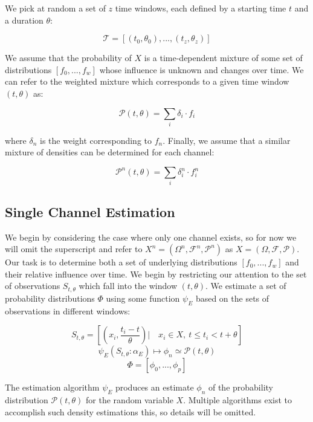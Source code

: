 \documentclass[10pt]{article}
\begin{document}
We pick at random a set of \( z \) time windows, each defined by a starting time \( t \) and a duration \( \theta \):

\[  \mathcal{T} = [(t_0,\theta_0),...,(t_z,\theta_z) ] \]

We assume that the probability of \(X \) is a time-dependent mixture of some set of distributions \( [f_0,...,f_w] \) whose influence is unknown and changes over time.  We can refer to the weighted mixture which corresponds to a given time window \( (t,\theta) \) as:

\begin{equation} \mathcal{P}(t,\theta) = \sum_i \delta_i \cdot f_i \end{equation}

where \( \delta_n \) is the weight corresponding to \( f_n \).  Finally, we assume that a similar mixture of densities can be determined for each channel:

\begin{equation} \mathcal{P}^n(t,\theta) = \sum_i \delta_i^n \cdot f_i^n \end{equation}

\subsection{Single Channel Estimation}
We begin by considering the case where only one channel exists, so for now we will omit the superscript and refer to \(X^n = (\Omega^n,\mathcal{F}^n,\mathcal{P}^n) \) as \(X = (\Omega, \mathcal{F},\mathcal{P}) \).  Our task is to determine both a set of underlying distributions \([f_0,...,f_w] \) and their relative influence over time.  We begin by restricting our attention to the set of observations \( S_{t,\theta} \) which fall into the window \( (t,\theta) \).  We estimate a set of probability distributions \(\Phi \) using some function \(\psi_E \) based on the sets of observations in different windows:

\begin{equation} S_{t,\theta} = \left[ \left( x_i,\frac{t_i - t}{\theta} \right) | \quad x_i \in X, \ t \le t_i < t+\theta \right] \end{equation}
\begin{equation} \label{eq:phiESingle}\psi_E( S_{t,\theta}:\alpha_E ) \mapsto \phi_n \simeq \mathcal{P}(t,\theta)  \end{equation}
\[ \Phi = [\phi_0,...,\phi_p ] \nonumber \]

The estimation algorithm \(\psi_{E} \) produces an estimate \(\phi_n \) of the probability distribution \( \mathcal{P}(t,\theta) \) for the random variable \( X \).  Multiple algorithms exist to accomplish such density estimations this, so details will be omitted.
\end{document}
